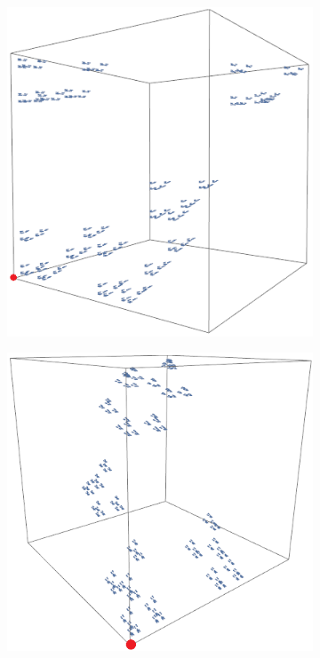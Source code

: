 \documentclass[12pt]{amsart}
\numberwithin{equation}{section}
\begin{document}
\begin{figure}[h]
\centering
\begin{subfigure}{0.35\textwidth}
  \centering
  \includegraphics[width=0.8\linewidth]{sponge11.png}
  \label{fig:sub1}
\end{subfigure}%
\begin{subfigure}{0.35\textwidth}
  \centering
  \includegraphics[width=0.85\linewidth]{sponge12.png}
  \label{fig:sub2}
\end{subfigure}%
\begin{subfigure}{0.35\textwidth}

\end{subfigure}
\end{figure}
\end{document}
